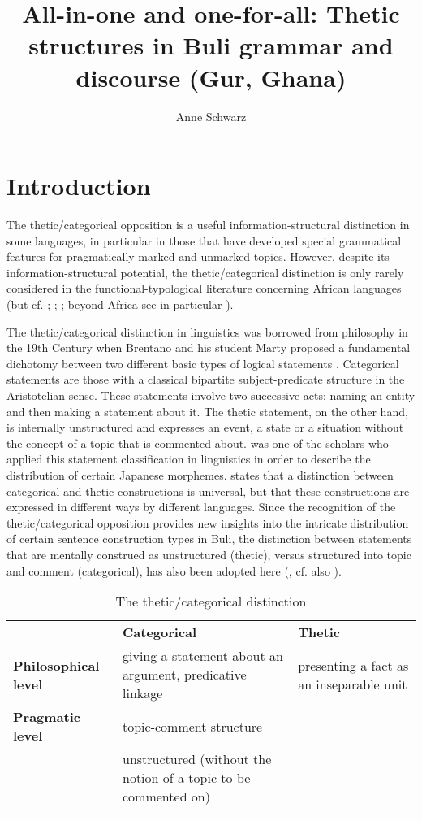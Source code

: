 \documentclass[output=paper]{langsci/langscibook}
\title{All-in-one and one-for-all: Thetic structures in Buli grammar and discourse (Gur, Ghana)}
\author{%
 Anne Schwarz \affiliation{Universidad Regional Amazónica IKIAM}
}
\begin{document}
 

\section{Introduction}

The thetic/categorical opposition is a useful information-structural distinction in some languages, in particular in those that have developed special grammatical features for pragmatically marked and unmarked topics. However, despite its information-structural potential, the thetic/categorical distinction is only rarely considered in the functional-typological literature concerning African languages (but cf. \citealt{Güldemann1996,Güldemann2010,Güldemann2012}; \citealt[250-253]{FiedlerEtAl2010}; \citealt{Schwarz2010a}; beyond Africa see in particular \citealt{Kuroda1972,Sasse1987,Sasse1995,Lambrecht1987,Lambrecht2000,Ulrich1988}). 

The thetic/categorical distinction in linguistics was borrowed from philosophy in the 19th Century when Brentano and his student Marty proposed a fundamental dichotomy between two different basic types of logical statements \citep[535]{Sasse1987}. Categorical statements are those with a classical bipartite subject-predicate structure in the Aristotelian sense. These statements involve two successive acts: naming an entity and then making a statement about it. The thetic statement, on the other hand, is internally unstructured and expresses an event, a state or a situation without the concept of a topic that is commented about. \citet{Kuroda1972} was one of the scholars who applied this statement classification in linguistics in order to describe the distribution of certain Japanese morphemes. \citet[388]{Ulrich1988} states that a distinction between categorical and thetic constructions is universal, but that these constructions are expressed in different ways by different languages. Since the recognition of the thetic/categorical opposition provides new insights into the intricate distribution of certain sentence construction types in Buli, the distinction between statements that are mentally construed as unstructured (thetic), versus structured into topic and comment (categorical), has also been adopted here (, cf. also \citealt{Ulrich1988}). 
 
\begin{table}
\caption{The thetic/categorical distinction}
\label{tab:1}

\begin{tabularx}{\textwidth}{XXX}
 & {\textbf{Categorical}} & {\textbf{Thetic }}\\
\lsptoprule
{\textbf{Philosophical level}} & {giving a statement about an argument, predicative linkage } & {presenting a fact as an inseparable unit}\\
{\textbf{Pragmatic level }} & {topic-comment structure}\\
& {unstructured (without the notion of a topic to be commented on)}\\
\lspbottomrule
\end{tabularx}
\end{table} 
\end{document}
